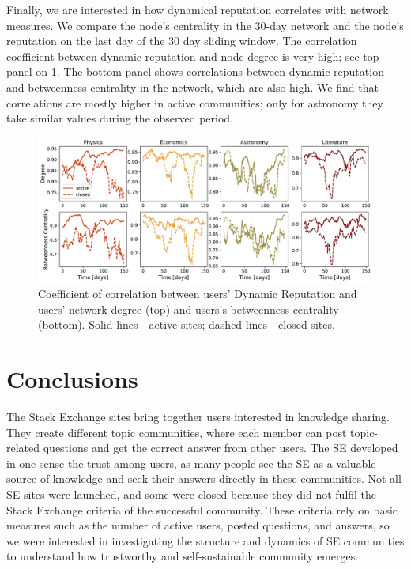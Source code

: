 Finally, we are interested in how dynamical reputation correlates with network measures. We compare the node's centrality in the 30-day network and the node's reputation on the last day of the 30 day sliding window. The correlation coefficient between dynamic reputation and node degree is very high; see top panel on \ref{fig:dyn_rep_centrality}. The bottom panel shows correlations between dynamic reputation and betweenness centrality in the network, which are also high. We find that correlations are mostly higher in active communities; only for astronomy they take similar values during the observed period. 

\begin{figure}[H]
	\centering
	\includegraphics[width=\linewidth]{figures/stackexchange/correlations.pdf}
	\caption[Coefficient correlation between ]{Coefficient of correlation between users' Dynamic Reputation and users' network degree (top) and users's betweenness centrality (bottom). Solid lines - active sites; dashed lines - closed sites.}
	\label{fig:dyn_rep_centrality}
\end{figure}

\section{Conclusions}

The Stack Exchange sites bring together users interested in knowledge sharing. They create different topic communities, where each member can post topic-related questions and get the correct answer from other users. The SE developed in one sense the trust among users, as many people see the SE as a valuable source of knowledge and seek their answers directly in these communities. Not all SE sites were launched, and some were closed because they did not fulfil the Stack Exchange criteria of the successful community. These criteria rely on basic measures such as the number of active users, posted questions, and answers, so we were interested in investigating the structure and dynamics of SE communities to understand how trustworthy and self-sustainable community emerges. 

